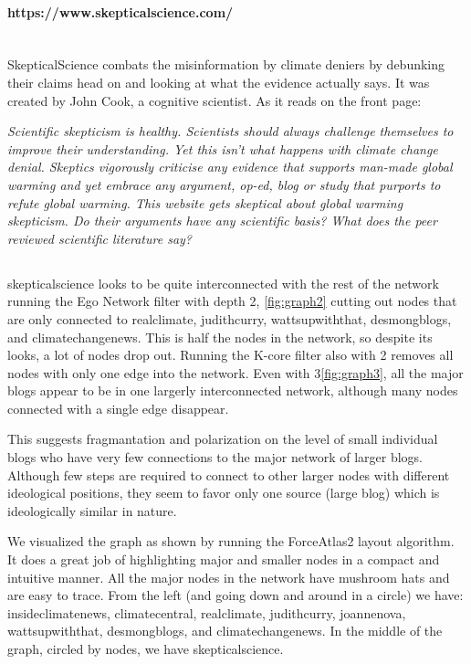 \documentclass[11pt]{article}
\begin{document}
\paragraph{https://www.skepticalscience.com/} \hspace{0pt} \\
SkepticalScience combats the misinformation by climate deniers by debunking their
claims head on and looking at what the evidence actually says. It was created by
John Cook, a cognitive scientist. As it reads on the front page:

\begin{displayquote}
\textit{Scientific skepticism is healthy. Scientists should always challenge themselves to
improve their understanding. Yet this isn't what happens with climate change denial.
Skeptics vigorously criticise any evidence that supports man-made global warming and
yet embrace any argument, op-ed, blog or study that purports to refute global warming.
This website gets skeptical about global warming skepticism. Do their arguments have
any scientific basis? What does the peer reviewed scientific literature say?}
\end{displayquote}

\subsection{}
skepticalscience looks to be quite interconnected with the rest of the network running
the Ego Network filter with depth 2, \ref{fig:graph2} cutting out nodes that are only
connected to realclimate, judithcurry, wattsupwiththat, desmongblogs, and climatechangenews.
This is half the nodes in the network, so despite its looks, a lot of nodes drop out.
Running the K-core filter also with 2 removes all nodes with only one edge
into the network. Even with 3\ref{fig:graph3}, all the major blogs appear to be in one largerly
interconnected network, although many nodes connected with a single edge disappear.

This suggests fragmantation and polarization on the level of small individual blogs
who have very few connections to the major network of larger blogs. Although
few steps are required to connect to other larger nodes with different ideological positions,
they seem to favor only one source (large blog) which is ideologically similar in nature.

We visualized the graph as shown by running the ForceAtlas2 layout algorithm. It does a great
job of highlighting major and smaller nodes in a compact and intuitive manner. All the major
nodes in the network have mushroom hats and are easy to trace. From the left (and going down
and around in a circle) we have: insideclimatenews, climatecentral, realclimate, judithcurry,
joannenova, wattsupwiththat, desmongblogs, and climatechangenews. In the middle of the graph,
circled by nodes, we have skepticalscience.
\end{document}
